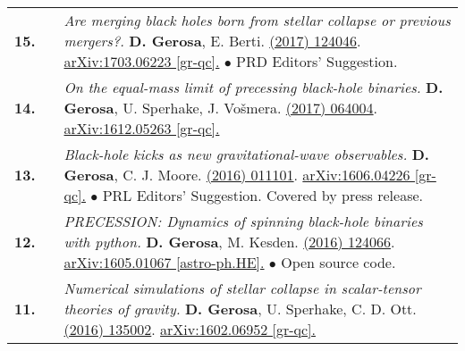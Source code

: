 {\begin{longtable}{rp{0.3cm}p{15.8cm}}
%
\textbf{15.} & & \textit{Are merging black holes born from stellar collapse or previous mergers?.}
\newline{}
\textbf{D. Gerosa}, E. Berti.
\newline{}
\href{http://dx.doi.org/10.1103/PhysRevD.95.124046}{\prd 95 (2017) 124046}. \href{https://arxiv.org/abs/1703.06223}{arXiv:1703.06223 [gr-qc].}
\newline{}
\textcolor{color1}{$\bullet$} PRD Editors' Suggestion.
\vspace{0.09cm}\\
%
\textbf{14.} & & \textit{On the equal-mass limit of precessing black-hole binaries.}
\newline{}
\textbf{D. Gerosa}, U. Sperhake, J. Vo\v{s}mera.
\newline{}
\href{http://dx.doi.org/10.1088/1361-6382/aa5e58}{\cqg 34 (2017) 064004}. \href{https://arxiv.org/abs/1612.05263}{arXiv:1612.05263 [gr-qc].}
\vspace{0.09cm}\\
%
\textbf{13.} & & \textit{Black-hole kicks as new gravitational-wave observables.}
\newline{}
\textbf{D. Gerosa}, C. J. Moore.
\newline{}
\href{http://dx.doi.org/10.1103/PhysRevLett.117.011101}{\prl 117 (2016) 011101}. \href{https://arxiv.org/abs/1606.04226}{arXiv:1606.04226 [gr-qc].}
\newline{}
\textcolor{color1}{$\bullet$} PRL Editors' Suggestion. Covered by press release.
\vspace{0.09cm}\\
%
\textbf{12.} & & \textit{PRECESSION: Dynamics of spinning black-hole binaries with python.}
\newline{}
\textbf{D. Gerosa}, M. Kesden.
\newline{}
\href{http://dx.doi.org/10.1103/PhysRevD.93.124066}{\prd 93 (2016) 124066}. \href{https://arxiv.org/abs/1605.01067}{arXiv:1605.01067 [astro-ph.HE].}
\newline{}
\textcolor{color1}{$\bullet$} Open source code.
\vspace{0.09cm}\\
%
\textbf{11.} & & \textit{Numerical simulations of stellar collapse in scalar-tensor theories of gravity.}
\newline{}
\textbf{D. Gerosa}, U. Sperhake, C. D. Ott.
\newline{}
\href{http://dx.doi.org/10.1088/0264-9381/33/13/135002}{\cqg 33 (2016) 135002}. \href{https://arxiv.org/abs/1602.06952}{arXiv:1602.06952 [gr-qc].}

\end{longtable}}
